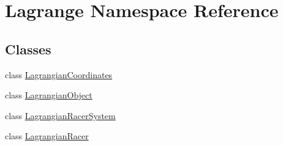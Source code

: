 \hypertarget{namespace_lagrange}{\section{Lagrange Namespace Reference}
\label{namespace_lagrange}
}
\subsection*{Classes}
\begin{DoxyCompactItemize}
\item 
class \hyperlink{class_lagrange_1_1_lagrangian_coordinates}{Lagrangian\-Coordinates}
\item 
class \hyperlink{class_lagrange_1_1_lagrangian_object}{Lagrangian\-Object}
\item 
class \hyperlink{class_lagrange_1_1_lagrangian_racer_system}{Lagrangian\-Racer\-System}
\item 
class \hyperlink{class_lagrange_1_1_lagrangian_racer}{Lagrangian\-Racer}
\end{DoxyCompactItemize}
